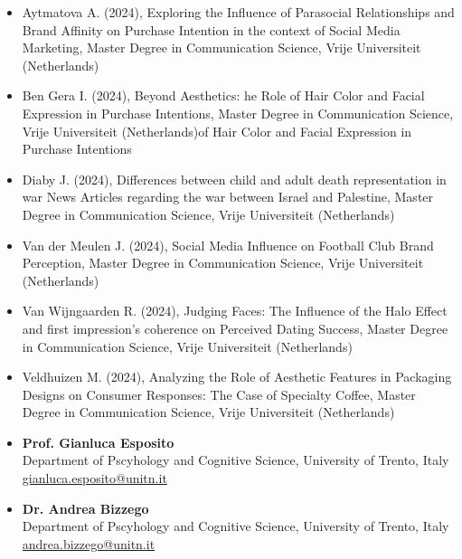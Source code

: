 \documentclass[10pt,a4paper]{altacv}
\begin{document}
\begin{fullwidth}
		\newpage
		\begin{itemize}
			
			\item Aytmatova A. (2024), Exploring the Influence of Parasocial Relationships and Brand Affinity on Purchase Intention in the context of Social Media Marketing, Master Degree in Communication Science, Vrije Universiteit (Netherlands)
			
			\item Ben Gera I. (2024), Beyond Aesthetics: he Role of Hair Color and Facial Expression in Purchase Intentions, Master Degree in Communication Science, Vrije Universiteit (Netherlands)of Hair Color and Facial Expression in Purchase Intentions
			
			\item Diaby J. (2024), Differences between child and adult death representation in war News Articles regarding the war between Israel and Palestine, Master Degree in Communication Science, Vrije Universiteit (Netherlands)
			
			\item Van der Meulen J. (2024), Social Media Influence on Football Club Brand Perception, Master Degree in Communication Science, Vrije Universiteit (Netherlands)
			
			\item Van Wijngaarden R. (2024), Judging Faces: The Influence of the Halo Effect and first impression’s coherence on Perceived Dating Success, Master Degree in Communication Science, Vrije Universiteit (Netherlands)
			
			\item Veldhuizen M. (2024), Analyzing the Role of Aesthetic Features in Packaging Designs on Consumer Responses: The Case of Specialty Coffee, Master Degree in Communication Science, Vrije Universiteit (Netherlands)

		\end{itemize}
		
		
		
		\begin{itemize}
			\item \textbf{Prof. Gianluca Esposito}\\
			Department of Pscyhology and Cognitive Science, University of Trento, Italy\\
			\href{mailto:gianluca.esposito@unitn.it}{gianluca.esposito@unitn.it}

			\item \textbf{Dr. Andrea Bizzego}\\
			Department of Pscyhology and Cognitive Science, University of Trento, Italy\\
			\href{mailto:andrea.bizzego@unitn.it}{andrea.bizzego@unitn.it}
			

\end{itemize}
\end{fullwidth}
\end{document}
